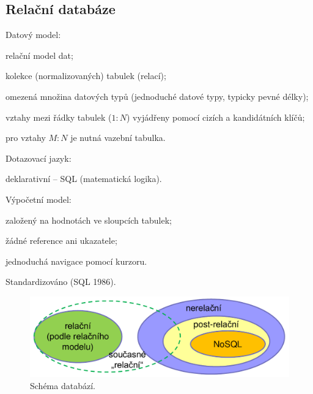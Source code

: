 \subsection{Relační databáze}

\begin{compactitem}
    \item Datový model: \begin{compactitem}
        \item relační model dat;
        \item kolekce (normalizovaných) tabulek (relací);
        \item omezená množina datových typů (jednoduché datové typy, typicky pevné délky);
        \item vztahy mezi řádky tabulek ($1:N$) vyjádřeny pomocí cizích a kandidátních klíčů;
        \item pro vztahy $M:N$ je nutná vazební tabulka.
    \end{compactitem}

    \item Dotazovací jazyk:\begin{compactitem}
        \item deklarativní -- SQL (matematická logika).
    \end{compactitem}

    \item Výpočetní model: \begin{compactitem}
        \item založený na hodnotách ve sloupcích tabulek;
        \item žádné reference ani ukazatele;
        \item jednoduchá navigace pomocí kurzoru.
    \end{compactitem}

    \item Standardizováno (SQL 1986).
\end{compactitem}

\begin{figure}[H]
    \centering
    \includegraphics[width=1\linewidth]{postrelacni.pdf}
    \caption{Schéma databází.}
\end{figure}


